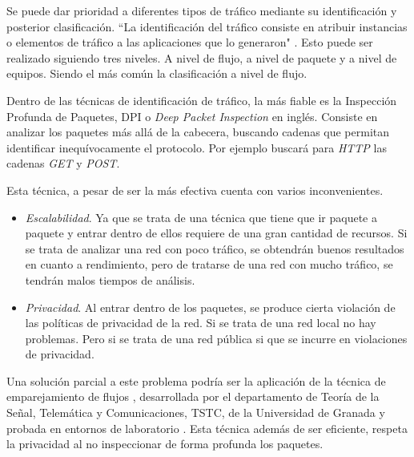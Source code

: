 \intro Se puede dar prioridad a diferentes tipos de tráfico mediante su identificación y posterior clasificación. ``La identificación 
del tráfico consiste en atribuir instancias o elementos de tráfico a las aplicaciones que lo generaron" \cite{jawad2016}. Esto puede 
ser realizado siguiendo tres niveles. A nivel de flujo, a nivel de paquete y a nivel de equipos. Siendo el más común la clasificación 
a nivel de flujo.


\intro Dentro de las técnicas de identificación de tráfico, la más fiable es la Inspección Profunda de Paquetes, DPI o \textit{Deep Packet Inspection} en inglés\cite{dpiaproximacion}. Consiste en analizar los paquetes más allá de la cabecera, buscando cadenas que 
permitan identificar inequívocamente el protocolo. Por ejemplo buscará para \textit{HTTP} las cadenas \textit{GET} y \textit{POST}.

\intro Esta técnica, a pesar de ser la más efectiva cuenta con varios inconvenientes.
\begin{itemize}
\item \textit{Escalabilidad}. Ya que se trata de una técnica que tiene que ir paquete a paquete y entrar dentro de ellos requiere de 
una gran cantidad de recursos. Si se trata de analizar una red con poco tráfico, se obtendrán buenos resultados en cuanto a 
rendimiento, pero de tratarse de una red con mucho tráfico, se tendrán malos tiempos de análisis.
\item \textit{Privacidad}. Al entrar dentro de los paquetes, se produce cierta violación de las políticas de privacidad de la red. Si 
se trata de una red local no hay problemas. Pero si se trata de una red pública si que se incurre en violaciones de privacidad.
\end{itemize}

\intro Una solución parcial a este problema podría ser la aplicación de la técnica de emparejamiento de flujos \cite{presentacion}, 
desarrollada por el departamento de Teoría de la Señal, Telemática y Comunicaciones, TSTC, de la Universidad de Granada y probada en 
entornos de laboratorio \cite{comparacion}. Esta técnica además de ser eficiente, respeta la privacidad al no inspeccionar de forma 
profunda los paquetes.

